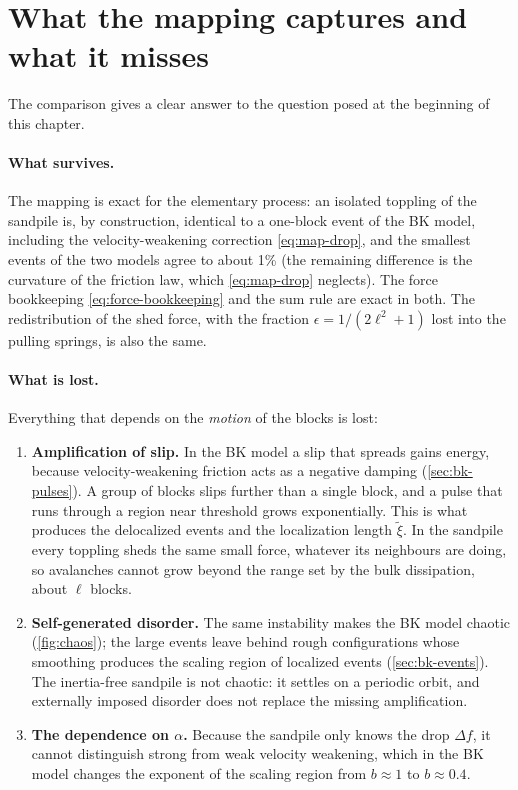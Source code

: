 \section{What the mapping captures and what it misses}
\label{sec:map-discussion}

The comparison gives a clear answer to the question posed at the beginning of this chapter.

\paragraph{What survives.} The mapping is exact for the elementary process: an isolated toppling of the sandpile is, by construction, identical to a
one-block event of the BK model, including the velocity-weakening correction \cref{eq:map-drop}, and the smallest events of the two models agree to about 1\% (the remaining difference is the curvature of the friction law, which \cref{eq:map-drop} neglects). The
force bookkeeping \cref{eq:force-bookkeeping} and the sum rule are exact in both. The redistribution of the shed force, with the fraction
$\epsilon=1/(2\ell^2+1)$ lost into the pulling springs, is also the same.

\paragraph{What is lost.} Everything that depends on the \emph{motion} of the blocks is lost:
\begin{enumerate}
  \item \textbf{Amplification of slip.} In the BK model a slip that spreads gains energy, because velocity-weakening friction acts as a negative damping
    (\cref{sec:bk-pulses}). A group of blocks slips further than a single block, and a pulse that runs through a region near threshold grows exponentially.
    This is what produces the delocalized events and the localization length $\tilde\xi$. In the sandpile every toppling sheds the same small force,
    whatever its neighbours are doing, so avalanches cannot grow beyond the range set by the bulk dissipation, about $\ell$ blocks.
  \item \textbf{Self-generated disorder.} The same instability makes the BK model chaotic (\cref{fig:chaos}); the large events leave behind rough
    configurations whose smoothing produces the scaling region of localized events (\cref{sec:bk-events}). The inertia-free sandpile is not chaotic: it
    settles on a periodic orbit, and externally imposed disorder does not replace the missing amplification.
  \item \textbf{The dependence on $\alpha$.} Because the sandpile only knows the drop $\Delta f$, it cannot distinguish strong from weak velocity weakening,
    which in the BK model changes the exponent of the scaling region from $b\approx1$ to $b\approx0.4$.
\end{enumerate}

